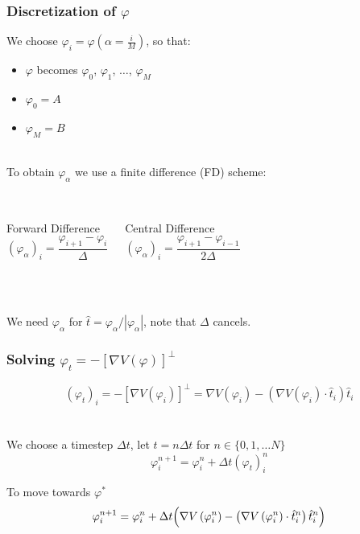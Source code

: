 \documentclass{beamer}
\renewcommand{\phi}{\varphi}
\renewcommand{\(}{\left(}
\renewcommand{\)}{\right)}
\newcommand{\dt}{\Delta t}
\begin{document}
\begin{frame}
\frametitle{Discretization of $\phi$}
We choose $\phi_i = \phi(\alpha = \frac{i}{M})$, so that:
\begin{itemize}
\item $\phi$ becomes $\phi_0$, $\phi_1$, $\dots$, $\phi_M$
\item  $\phi_0 = A$
\item $\phi_M = B$
\end{itemize}
~\\
To obtain $\phi_\alpha$ we use a finite difference (FD) scheme:\\
~\\
\begin{columns}[c]
\begin{block}{Forward Difference}
$$(\phi_\alpha)_i = \frac{\phi_{i+1}-\phi_i}{\Delta}$$
\end{block}
\begin{block}{Central Difference}
$$(\phi_\alpha)_i = \frac{\phi_{i+1}-\phi_{i-1}}{2\Delta}$$
\end{block}%
\end{columns}
~\\
~\\
We need $\phi_\alpha$ for $\hat t = \phi_\alpha / |\phi_\alpha|$, note that $\Delta$ cancels.
\end{frame}

\begin{frame}
\frametitle{Solving $\phi_t=-[\nabla V(\phi)]^\bot$}
$$(\phi_t)_i=-[\nabla V(\phi_i)]^\bot = \nabla V(\phi_i) - (\nabla V(\phi_i) \cdot \hat t_i)\hat t_i$$\\~\\
We choose a timestep $\dt$, let $t=n\dt$ for $n\in\{0, 1, \dots N\}$\\
$$\phi_i^{n+1} = \phi_i^n+\dt(\phi_t)_i^n$$
\begin{block}{To move towards $\phi^*$}
$$\phi_i^{n+1} = \phi_i^n+\dt\Big{(}\nabla V\(\phi_i^n\) - \(\nabla V\(\phi_i^n\) \cdot \hat t_i^n\)\hat t_i^n\Big{)}$$
\end{block}


\end{frame}

\begin{frame}
\end{frame}
\end{document}

